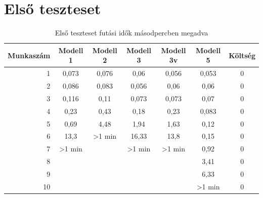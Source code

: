 \documentclass {report}
\begin{document}
   \section{Első teszteset}
   \begin{table}[htpb]
   \centering
   \setlength{\tabcolsep}{4pt}
	\begin{tabular}{r|cccccc}
	   Munkaszám & Modell 1 & Modell 2 & Modell 3 & Modell 3v & Modell 5 & Költség \\ 
	   \hline 
	   1 & 0,073 & 0,076 & 0,06 & 0,056 & 0,053 & 0 \\ 
	   
	   2 & 0,086 & 0,083 & 0,056 & 0,06 & 0,06 & 0 \\ 
	   
	   3 & 0,116 & 0,11 & 0,073 & 0,073 & 0,07 & 0 \\ 
	   
	   4 & 0,23 & 0,43 & 0,18 & 0,23 & 0,083 & 0 \\ 
	  
	   5 & 0,69 & 4,48 & 1,94 & 1,63 & 0,12 & 0 \\ 
	
	   6 & 13,3 & >1 min & 16,33 & 13,8 & 0,15 & 0 \\ 
	   
	   7 & >1 min &  & >1 min & >1 min & 0,92 & 0 \\ 
	   
	   8 &  &  &  &  & 3,41 & 0 \\ 
	   
	   9 &  &  &  &  & 6,33 & 0 \\ 
	   
	   10 &  &  &  &  & >1 min & 0 \\ 
	  
	   \end{tabular} 
	   \label{tab:elsotablazat}
	    \caption{Első teszteset futási idők másodpercben megadva}
   \end{table}
   
\end{document}
